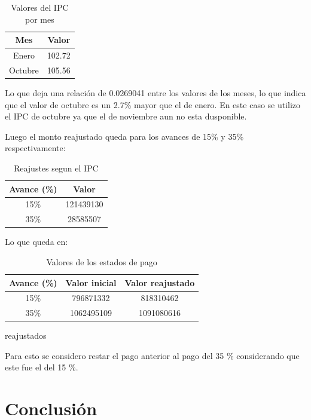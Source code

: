 \documentclass{article} %
\begin{document}
\begin{table}[H]
    \centering
    \begin{tabular}{|c|c|}
    \hline
    \textbf{Mes} & \textbf{Valor} \\ \hline
    Enero       & 102.72         \\ \hline
    Octubre     & 105.56         \\ \hline
    \end{tabular}
    \caption{Valores del IPC por mes}
    \label{tabla:valores_mes}
\end{table}

Lo que deja una relación de 0.0269041 entre los valores de los meses, lo que indica que el valor de octubre es un 2.7\% mayor que el de enero. En este caso se utilizo el IPC de octubre ya que el de noviembre aun no esta dusponible.

Luego el monto reajustado queda para los avances de 15\% y 35\% respectivamente:

\begin{table}[H]
    \centering
    \begin{tabular}{|c|c|}
    \hline
    \textbf{Avance (\%)} & \textbf{Valor} \\ \hline
    15\%       & 121439130         \\ \hline
    35\%     & 28585507         \\ \hline
    \end{tabular}
    \caption{Reajustes segun el IPC}
    \label{tabla:reajuste}
\end{table}

Lo que queda en:

\begin{table}[H]
    \centering
    \begin{tabular}{|c|c|c|}
    \hline
    \textbf{Avance (\%)} & \textbf{Valor inicial}  &  \textbf{Valor reajustado}\\ \hline
    15\%       & 796871332 & 818310462      \\ \hline
    35\%     & 1062495109 &  1091080616     \\ \hline
    \end{tabular}
    \caption{Valores de los estados de pago} reajustados
    \label{tabla:reajustado}
\end{table}
    
Para esto se considero restar el pago anterior al pago del 35 \% considerando que este fue el del 15 \%.

\newpage
\section{Conclusión}
\end{document}
